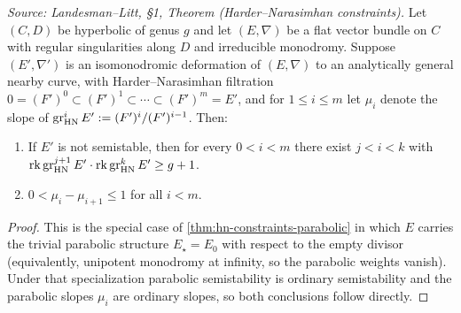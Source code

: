 \begin{theorem}
  \label{thm:hn-constraints}
  \textit{Source: Landesman--Litt, \S1, Theorem (Harder--Narasimhan constraints).}
  Let $(C, D)$ be hyperbolic of genus $g$ and let $(E, \nabla)$ be a flat vector
  bundle on $C$ with regular singularities along $D$ and irreducible monodromy.
  Suppose $(E', \nabla')$ is an isomonodromic deformation of $(E, \nabla)$ to an
  analytically general nearby curve, with Harder--Narasimhan filtration
  $0 = (F')^0 \subset (F')^1 \subset \cdots \subset (F')^m = E'$, and for
  $1 \leq i \leq m$ let $\mu_i$ denote the slope of
  $\operatorname{gr}^i_{\mathrm{HN}} E' := (F')^i / (F')^{i-1}$. Then:
  \begin{enumerate}
    \item If $E'$ is not semistable, then for every $0 < i < m$ there exist
      $j < i < k$ with
      $\operatorname{rk} \operatorname{gr}^{j+1}_{\mathrm{HN}} E' \cdot \operatorname{rk} \operatorname{gr}^k_{\mathrm{HN}} E' \geq g + 1$.
    \item $0 < \mu_i - \mu_{i+1} \leq 1$ for all $i < m$.
  \end{enumerate}
\end{theorem}

\begin{proof}
  This is the special case of \cref{thm:hn-constraints-parabolic} in which $E$
  carries the trivial parabolic structure $E_\star = E_0$ with respect to the
  empty divisor (equivalently, unipotent monodromy at infinity, so the parabolic
  weights vanish). Under that specialization parabolic semistability is ordinary
  semistability and the parabolic slopes $\mu_i$ are ordinary slopes, so both
  conclusions follow directly.
\end{proof}

